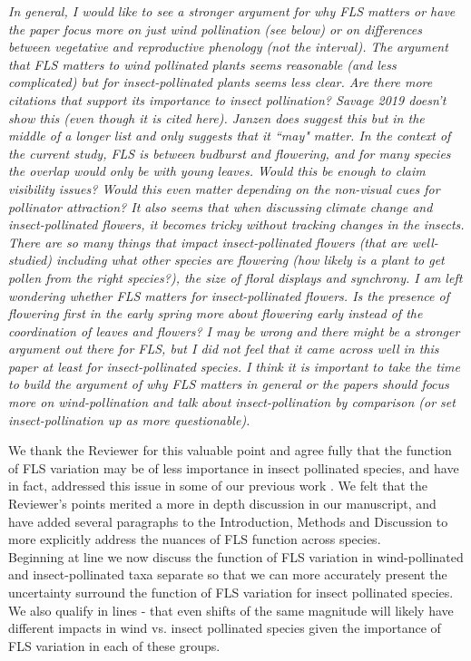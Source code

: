 \documentclass[11pt]{article}
\begin{document}
\emph{In general, I would like to see a stronger argument for why FLS matters or have the paper focus more on just wind pollination (see below) or on differences between vegetative and reproductive phenology (not the interval). The argument that FLS matters to wind pollinated plants seems reasonable (and less complicated) but for insect-pollinated plants seems less clear. Are there more citations that support its importance to insect pollination? Savage 2019 doesn’t show this (even though it is cited here). Janzen does suggest this but in the middle of a longer list and only suggests that it ``may" matter. In the context of the current study, FLS is between budburst and flowering, and for many species the overlap would only be with young leaves. Would this be enough to claim visibility issues? Would this even matter depending on the non-visual cues for pollinator attraction? It also seems that when discussing climate change and insect-pollinated flowers, it becomes tricky without tracking changes in the insects. There are so many things that impact insect-pollinated flowers (that are well-studied) including what other species are flowering (how likely is a plant to get pollen from the right species?), the size of floral displays and synchrony. I am left wondering whether FLS matters for insect-pollinated flowers. Is the presence of flowering first in the early spring more about flowering early instead of the coordination of leaves and flowers?  I may be wrong and there might be a stronger argument out there for FLS, but I did not feel that it came across well in this paper at least for insect-pollinated species. I think it is important to take the time to build the argument of why FLS matters in general or the papers should focus more on wind-pollination and talk about insect-pollination by comparison (or set insect-pollination up as more questionable).}

\noindent We thank the Reviewer for this valuable point and agree fully that the function of FLS variation may be of less importance in insect pollinated species, and have in fact, addressed this issue in some of our previous work \citep{Buonaiuto2020}. We felt that the Reviewer's points merited a more in depth discussion in our manuscript, and have added several paragraphs to the Introduction, Methods and Discussion to more explicitly address the nuances of FLS function across species.\\

\noindent Beginning at line  we now discuss the function of FLS variation in wind-pollinated and insect-pollinated taxa separate so that we can more accurately present the uncertainty surround the function of FLS variation for insect pollinated species. We also qualify in lines - that even shifts of the same magnitude will likely have different impacts in wind vs. insect pollinated species given the importance of FLS variation in each of these groups.\\
\end{document}
